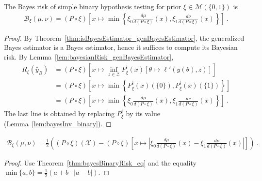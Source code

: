 \begin{theorem}
  \label{thm:bayesBinaryRisk_eq}
  The Bayes risk of simple binary hypothesis testing for prior $\xi \in \mathcal M(\{0,1\})$ is
  \begin{align*}
  \mathcal B_\xi(\mu, \nu) = (P \circ \xi)\left[x \mapsto \min \left\{\xi_0\frac{d \mu}{d(P \circ \xi)}(x), \xi_1\frac{d \nu}{d(P \circ \xi)}(x)\right\}\right]
  \: .
  \end{align*}
\end{theorem}

\begin{proof}%
{}
By Theorem~\ref{thm:isBayesEstimator_genBayesEstimator}, the generalized Bayes estimator is a Bayes estimator, hence it suffices to compute its Bayesian risk.
By Lemma~\ref{lem:bayesianRisk_genBayesEstimator},
\begin{align*}
R_\xi(\hat{y}_B)
&= (P \circ \xi)\left[x \mapsto \inf_{z \in \mathcal Z} P_\xi^\dagger(x) \left[\theta \mapsto \ell'(y(\theta), z)\right]\right]
\\
&= (P \circ \xi)\left[x \mapsto \min \left\{P_\xi^\dagger(x)(\{0\}), P_\xi^\dagger(x)(\{1\})\right\}\right]
\\
&= (P \circ \xi)\left[x \mapsto \min \left\{\xi_0\frac{d \mu}{d(P \circ \xi)}(x), \xi_1\frac{d \nu}{d(P \circ \xi)}(x)\right\}\right]
\: .
\end{align*}
The last line is obtained by replacing $P_\xi^\dagger$ by its value (Lemma~\ref{lem:bayesInv_binary}).
\end{proof}

\begin{corollary}
  \label{cor:bayesBinaryRisk_eq_abs}
  \begin{align*}
  \mathcal B_\xi(\mu, \nu) = \frac{1}{2}\left((P \circ \xi)(\mathcal X) -  (P \circ \xi)\left[x \mapsto \left\vert \xi_0\frac{d \mu}{d(P \circ \xi)}(x) - \xi_1\frac{d \nu}{d(P \circ \xi)}(x)\right\vert\right] \right)
  \: .
  \end{align*}
\end{corollary}

\begin{proof}%
{}
Use Theorem~\ref{thm:bayesBinaryRisk_eq} and the equality $\min\{a,b\} = \frac{1}{2}(a + b - \vert a - b \vert)$.
\end{proof}


